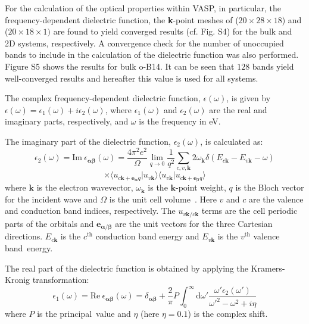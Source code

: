 \documentclass[aps,prb,preprint,notitlepage]{revtex4-2}
\begin{document}
For the calculation of the optical properties within VASP, in particular, the 
frequency-dependent dielectric function, the {\bf k}-point meshes 
of ($20\times28\times18$) and ($20\times18\times1)$ are 
found to yield converged results (cf. Fig. S4) for the bulk and 2D systems, respectively.
A convergence check for the number of unoccupied bands to 
include 
in the calculation of the dielectric function was also performed. 
Figure S5 shows the results 
for bulk o-B14. It can be seen that $128$ bands yield 
well-converged results and hereafter this value is used for all systems.

The complex frequency-dependent dielectric function, $\epsilon(\omega)$, 
is given by $\epsilon(\omega) = \epsilon_{1}(\omega) + i\epsilon_{2}(\omega)$, where $\epsilon_{1}(\omega)$ 
and $\epsilon_{2}(\omega)$ are the real and imaginary parts, respectively, 
and $\omega$ is the frequency in eV.

The imaginary part of the dielectric function, $\epsilon_{2}(\omega)$, is calculated as:
\begin{displaymath}
    \epsilon_{2}(\omega) = \mathrm{Im} \ \epsilon_{\boldsymbol{\alpha} \boldsymbol{\beta}} (\omega) = \frac{4\pi^{2}e^{2}}{\Omega} \lim_{q\rightarrow0} \frac{1}{q^2} \sum_{c,v,\mathbf{k}} 2\omega_{\mathbf{k}} \delta(E_{c\mathbf{k}}-E_{v\mathbf{k}}-\omega) 
\end{displaymath}
\begin{equation}
	\times \langle {u_{c\mathbf{k}+\mathbf{e}_{\boldsymbol{\alpha}} q}
	|u_{v\mathbf{k}}}\rangle \langle {u_{v\mathbf{k}}|u_{c\mathbf{k}+
	\mathbf{e}_{\boldsymbol{\beta}} q}}\rangle  
    \label{eqn:dielectric_im}
\end{equation}
where $\mathbf{k}$ is the electron wavevector, $\omega_{\mathbf{k}}$ is the $\mathbf{k}$-point weight, $q$ is the Bloch vector for the incident wave and $\Omega$ is the unit cell volume~\cite{Dielectric_textbook,VASP_Dielectric_2006}. 
Here $v$ and $c$ are the valence and conduction band indices, respectively. The $u_{v\mathbf{k}/c\mathbf{k}}$ terms are the cell periodic parts of the orbitals and $\mathbf{e}_{\boldsymbol{\alpha/\beta}}$ are the unit vectors for the three Cartesian directions. $E_{c\mathbf{k}}$ is the $c^{\mathrm{th}}$ conduction band energy and $E_{v\mathbf{k}}$ is the $v^{\mathrm{th}}$ valence band~energy. 


The real part of the dielectric function is obtained by applying the 
Kramers-Kronig transformation:
\begin{equation}
    \epsilon_{1}(\omega) = \mathrm{Re} \ \epsilon_{\boldsymbol{\alpha} \boldsymbol{\beta}} (\omega) = \delta_{\boldsymbol{\alpha} \boldsymbol{\beta}} + \frac{2}{\pi}P \int_{0}^{\infty} \mathrm{d}\omega' \frac{\omega'\epsilon_{2}(\omega')}{\omega'^{2}-\omega^{2}+i\eta}
    \label{eqn:dielectric_real}
\end{equation}
where $P$ is the principal~value and $\eta$ (here $\eta=0.1$) is the complex 
shift.
\end{document}

